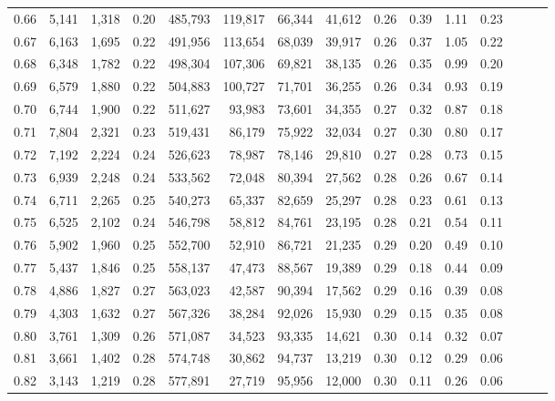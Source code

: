 \begin{tabular}{rrrrrrrrrrrrrrr}
0.66 &   5,141 &  1,318 &  0.20 &  485,793 &  119,817 &   66,344 &   41,612 &  0.26 &  0.39 &  1.11 &      0.23 \\
0.67 &   6,163 &  1,695 &  0.22 &  491,956 &  113,654 &   68,039 &   39,917 &  0.26 &  0.37 &  1.05 &      0.22 \\
0.68 &   6,348 &  1,782 &  0.22 &  498,304 &  107,306 &   69,821 &   38,135 &  0.26 &  0.35 &  0.99 &      0.20 \\
0.69 &   6,579 &  1,880 &  0.22 &  504,883 &  100,727 &   71,701 &   36,255 &  0.26 &  0.34 &  0.93 &      0.19 \\
0.70 &   6,744 &  1,900 &  0.22 &  511,627 &   93,983 &   73,601 &   34,355 &  0.27 &  0.32 &  0.87 &      0.18 \\
0.71 &   7,804 &  2,321 &  0.23 &  519,431 &   86,179 &   75,922 &   32,034 &  0.27 &  0.30 &  0.80 &      0.17 \\
0.72 &   7,192 &  2,224 &  0.24 &  526,623 &   78,987 &   78,146 &   29,810 &  0.27 &  0.28 &  0.73 &      0.15 \\
0.73 &   6,939 &  2,248 &  0.24 &  533,562 &   72,048 &   80,394 &   27,562 &  0.28 &  0.26 &  0.67 &      0.14 \\
0.74 &   6,711 &  2,265 &  0.25 &  540,273 &   65,337 &   82,659 &   25,297 &  0.28 &  0.23 &  0.61 &      0.13 \\
0.75 &   6,525 &  2,102 &  0.24 &  546,798 &   58,812 &   84,761 &   23,195 &  0.28 &  0.21 &  0.54 &      0.11 \\
0.76 &   5,902 &  1,960 &  0.25 &  552,700 &   52,910 &   86,721 &   21,235 &  0.29 &  0.20 &  0.49 &      0.10 \\
0.77 &   5,437 &  1,846 &  0.25 &  558,137 &   47,473 &   88,567 &   19,389 &  0.29 &  0.18 &  0.44 &      0.09 \\
0.78 &   4,886 &  1,827 &  0.27 &  563,023 &   42,587 &   90,394 &   17,562 &  0.29 &  0.16 &  0.39 &      0.08 \\
0.79 &   4,303 &  1,632 &  0.27 &  567,326 &   38,284 &   92,026 &   15,930 &  0.29 &  0.15 &  0.35 &      0.08 \\
0.80 &   3,761 &  1,309 &  0.26 &  571,087 &   34,523 &   93,335 &   14,621 &  0.30 &  0.14 &  0.32 &      0.07 \\
0.81 &   3,661 &  1,402 &  0.28 &  574,748 &   30,862 &   94,737 &   13,219 &  0.30 &  0.12 &  0.29 &      0.06 \\
0.82 &   3,143 &  1,219 &  0.28 &  577,891 &   27,719 &   95,956 &   12,000 &  0.30 &  0.11 &  0.26 &      0.06 \\

\end{tabular}
